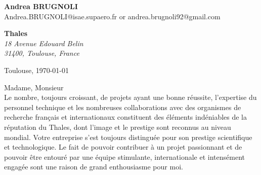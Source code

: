 \documentclass[11pt]{letter}
\begin{document}
 \sffamily
 \begin{flushleft}
 {\bfseries Andrea \textsc{BRUGNOLI}}\\[.35ex]
 Andrea.BRUGNOLI@isae.supaero.fr or andrea.brugnoli92@gmail.com
 \end{flushleft}
 \begin{flushright}
 {\bfseries Thales}\\[.35ex]
 \small\itshape
 18 Avenue Edouard Belin\\
 31400, Toulouse, France
 \end{flushright}
 \begin{flushright}
 Toulouse, \today 
 \end{flushright}


Madame, Monsieur \\
Le nombre, toujours croissant, de projets ayant une bonne réussite, l'expertise du personnel technique et les nombreuses collaborations avec des organismes de recherche français et internationaux constituent  des éléments indéniables de la réputation du Thales, dont l'image et le prestige sont reconnus au niveau mondial. Votre entreprise s'est toujours distinguée pour son prestige scientifique et technologique. Le fait de pouvoir contribuer à un projet passionnant et de pouvoir être entouré par une équipe stimulante, internationale et intensément engagée sont une raison de grand enthousiasme pour moi. 
\end{document}
